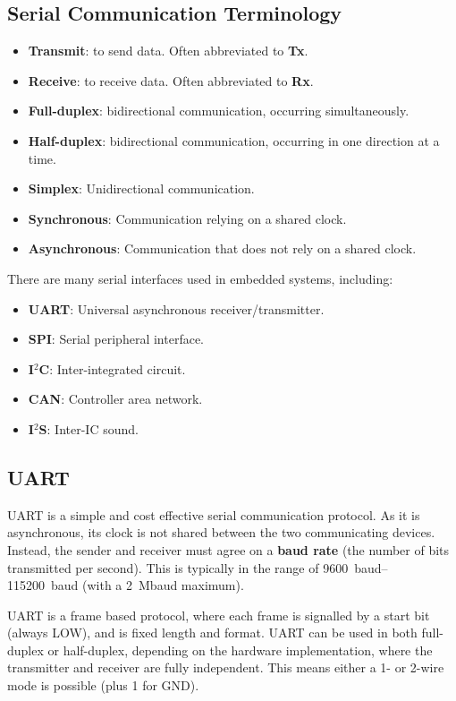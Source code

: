 \documentclass[a4paper]{report}
\begin{document}
\subsection{Serial Communication Terminology}
\begin{itemize}
    \item \textbf{Transmit}: to send data. Often abbreviated to \textbf{Tx}.
    \item \textbf{Receive}: to receive data. Often abbreviated to \textbf{Rx}.
    \item \textbf{Full-duplex}: bidirectional communication, occurring simultaneously.
    \item \textbf{Half-duplex}: bidirectional communication, occurring in one direction at a time.
    \item \textbf{Simplex}: Unidirectional communication.
    \item \textbf{Synchronous}: Communication relying on a shared clock.
    \item \textbf{Asynchronous}: Communication that does not rely on a shared clock.
\end{itemize}
There are many serial interfaces used in embedded systems, including:
\begin{itemize}
    \item \textbf{UART}: Universal asynchronous receiver/transmitter.
    \item \textbf{SPI}: Serial peripheral interface.
    \item \textbf{I\({}^2\)C}: Inter-integrated circuit.
    \item \textbf{CAN}: Controller area network.
    \item \textbf{I\({}^2\)S}: Inter-IC sound.
\end{itemize}
\subsection{UART}
UART is a simple and cost effective serial communication protocol. As it is asynchronous,
its clock is not shared between the two communicating devices. Instead, the sender and receiver
must agree on a \textbf{baud rate} (the number of bits transmitted per second). This is
typically in the range of \qtyrange[range-phrase=~to~]{9600}{115200}{baud} (with a \qty{2}{Mbaud} maximum).

UART is a frame based protocol, where each frame is signalled by a start bit (always LOW),
and is fixed length and format. UART can be used in both full-duplex or half-duplex,
depending on the hardware implementation, where the transmitter and receiver are
fully independent. This means either a 1- or 2-wire mode is possible (plus 1 for GND).
\end{document}
